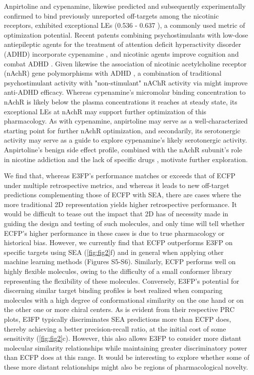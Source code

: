 \documentclass[../main.tex]{subfiles}
\begin{document}
\begin{refsection}
Anpirtoline and cypenamine, likewise predicted and subsequently experimentally confirmed to bind previously unreported off-targets among the nicotinic receptors, exhibited exceptional LEs (0.536 - 0.637  \LEunit{}), a commonly used metric of optimization potential.
Recent patents combining psychostimulants with low-dose antiepileptic agents for the treatment of attention deficit hyperactivity disorder  (ADHD) incorporate cypenamine \cite{bird_2016,bird_2015}, and nicotinic agents improve cognition and combat ADHD \cite{fleisher_2014}.
Given likewise the association of nicotinic acetylcholine receptor (nAchR)  gene polymorphisms with ADHD \cite{kent_2001}, a combination of traditional psychostimulant activity with "non-stimulant" nAChR activity via  might improve anti-ADHD efficacy.
Whereas cypenamine's micromolar binding concentration to nAchR is likely below the plasma concentrations it reaches at steady state, its exceptional LEs at nAchR may support further optimization of this pharmacology.
As with cypenamine, anpirtoline may serve as a well-characterized starting point for further nAchR optimization, and secondarily, its serotonergic activity may serve as a guide to explore cypenamine's likely serotonergic activity.
Anpirtoline's benign side effect profile, combined with the nAchR  subunit's role in nicotine addiction  \cite{salas_2004} and the lack of  specific drugs  \cite{zaveri_2010} , motivate further exploration.

We find that, whereas E3FP's performance matches or exceeds that of ECFP under multiple retrospective metrics, and whereas it leads to new off-target predictions complementing those of ECFP with SEA, there are cases where the more traditional 2D representation yields higher retrospective performance.
It would be difficult to tease out the impact that 2D has of necessity made in guiding the design and testing of such molecules, and only time will tell whether ECFP's higher performance in these cases is due to true pharmacology or historical bias.
However, we currently find that ECFP outperforms E3FP on specific targets using SEA  (\cref{fig:fig2}f) and in general when applying other machine learning methods  (Figures S5-S6).
Similarly, ECFP performs well on highly flexible molecules, owing to the difficulty of a small conformer library representing the flexibility of these molecules.
Conversely, E3FP's potential for discerning similar target binding profiles is best realized when comparing molecules with a high degree of conformational similarity on the one hand or on the other one or more chiral centers.
As is evident from their respective PRC plots, E3FP typically discriminates SEA predictions more than ECFP does, thereby achieving a better precision-recall ratio, at the initial cost of some sensitivity  (\cref{fig:fig2}c).
However, this also allows E3FP to consider more distant molecular similarity relationships while maintaining greater discriminatory power than ECFP does at this range.
It would be interesting to explore whether some of these more distant relationships might also be regions of pharmacological novelty.


\end{refsection}
\end{document}
